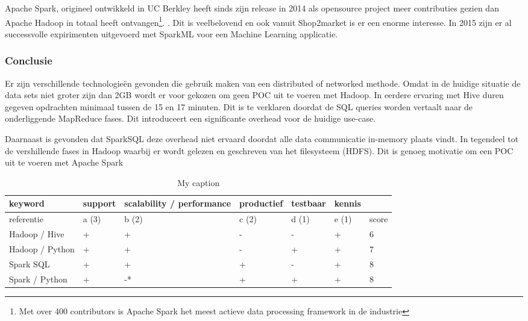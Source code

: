 Apache Spark, origineel ontwikkeld in UC Berkley heeft sinds zijn release in 2014 als opensource project meer contributies gezien dan Apache Hadoop in totaal heeft ontvangen\footnote{Met over 400 contributors is Apache Spark het meest actieve data processing framework in de industrie}. \parencite{armbrust2015spark}. Dit is veelbelovend en ook vanuit Shop2market is er een enorme interesse. In 2015 zijn er al successvolle expirimenten uitgevoerd met SparkML voor een Machine Learning applicatie.

\subsubsection{\textbf{Conclusie}}

Er zijn verschillende technologieën gevonden die gebruik maken van een distributed of networked methode. Omdat in de huidige situatie de data sets niet groter zijn dan 2GB wordt er voor gekozen om geen POC uit te voeren met Hadoop.  In eerdere ervaring met Hive duren gegeven opdrachten minimaal tussen de 15 en 17 minuten. Dit is te verklaren doordat de SQL queries worden vertaalt naar de onderliggende MapReduce fases. \parencite{thusoo2010hive} Dit introduceert een significante overhead voor de huidige use-case.

Daarnaast is gevonden dat SparkSQL deze overhead niet ervaard doordat alle data communicatie in-memory plaats vindt. In tegendeel tot de vershillende fases in Hadoop waarbij er wordt gelezen en geschreven van het filesysteem (HDFS). Dit is genoeg motivatie om een POC uit te voeren met Apache Spark

\begin{table}[bh]
\caption{My caption}
\label{tab:matrix_distributed}
\begin{tabular}{|l|l|l|l|l|l|l|}
\hline
keyword         & support & scalability / performance & productief & testbaar & kennis &       \\ \hline
referentie      & a (3)   & b (2)                     & c (2)      & d (1)    & e (1)  & score \\ \hline
Hadoop / Hive   & +       & +                         & -          & -        & +      & 6     \\ \hline
Hadoop / Python & +       & +                         & -          & +        & +      & 7     \\ \hline
Spark SQL       & +       & +                         & +          & -        & +      & 8     \\ \hline
Spark / Python  & +       & -*                        & +          & +        & +      & 8     \\ \hline
\end{tabular}
\end{table}